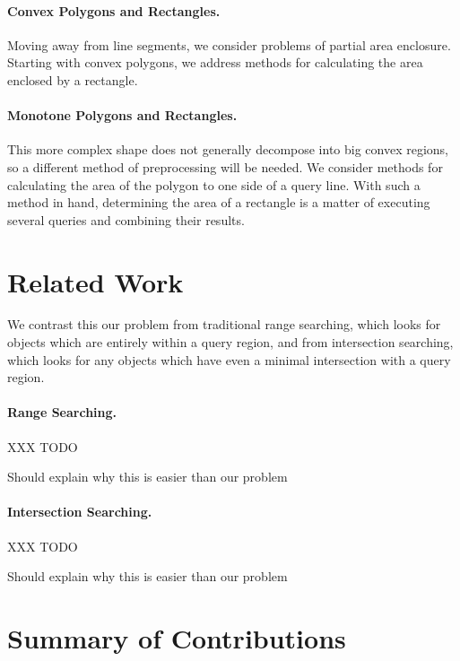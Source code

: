\paragraph{Convex Polygons and Rectangles.} Moving away from line segments, we consider problems of partial area enclosure. 
Starting with convex polygons, we address methods for calculating the area enclosed by a rectangle. 
 
\paragraph{Monotone Polygons and Rectangles.} This more complex shape does not generally decompose into big convex regions, so a different method of preprocessing will be needed.
We consider methods for calculating the area of the polygon to one side of a query line. 
With such a method in hand, determining the area of a rectangle is a matter of executing several queries and combining their results.

\section{Related Work}
\label{:intro:related}

We contrast this our problem from traditional range searching, which looks for objects which are entirely within a query region, and from intersection searching, which looks for any objects which have even a minimal intersection with a query region.

\paragraph{Range Searching.} 
XXX TODO

Should explain why this is easier than our problem

\paragraph{Intersection Searching.} 
XXX TODO

Should explain why this is easier than our problem


\section{Summary of Contributions}
\label{:intro:contributions}

